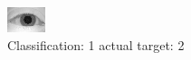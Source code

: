 \begin{figure}[h!]
\begin{center}
\includegraphics[width=0.60\columnwidth]{figures/ID924_class_1_target_2.png}
\end{center}
\caption{ Classification: 1 actual target: 2}
\label{fig:ID924_class_1_target_2}
\end{figure}
